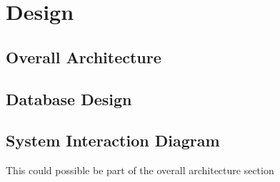 \chapter{Design}

\section{Overall Architecture}

\section{Database Design}

\section{System Interaction Diagram}
This could possible be part of the overall architecture section